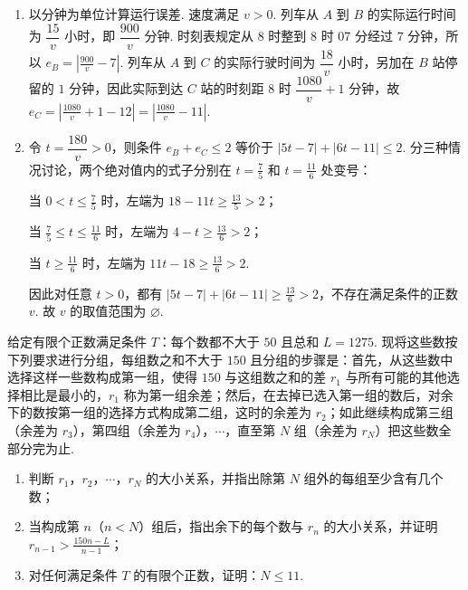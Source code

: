 \begin{solution}
\begin{enumerate}
\item 以分钟为单位计算运行误差. 速度满足 \(v>0\). 列车从 \(A\) 到 \(B\) 的实际运行时间为
\(\dfrac{15}{v}\) 小时，即 \(\dfrac{900}{v}\) 分钟. 时刻表规定从 8 时整到 8 时 07 分经过 \(7\) 分钟，所以
\(e_{B}=\left\lvert\frac{900}{v}-7\right\rvert\).
列车从 \(A\) 到 \(C\) 的实际行驶时间为 \(\dfrac{18}{v}\) 小时，另加在 \(B\) 站停留的 \(1\) 分钟，因此实际到达 \(C\) 站的时刻距 \(8\) 时
\(\dfrac{1080}{v}+1\) 分钟，故
\(e_{C}=\left\lvert\frac{1080}{v}+1-12\right\rvert=\left\lvert\frac{1080}{v}-11\right\rvert\).

\item 令 \(t=\dfrac{180}{v}>0\)，则条件 \(e_{B}+e_{C}\leqslant2\) 等价于
\(\lvert5t-7\rvert+\lvert6t-11\rvert\leqslant2\).
分三种情况讨论，两个绝对值内的式子分别在 \(t=\frac{7}{5}\) 和 \(t=\frac{11}{6}\) 处变号：

当 \(0<t\leqslant\frac{7}{5}\) 时，左端为
\(18-11t\geqslant\frac{13}{5}>2\)；

当 \(\frac{7}{5}\leqslant t\leqslant\frac{11}{6}\) 时，左端为
\(4-t\geqslant\frac{13}{6}>2\)；

当 \(t\geqslant\frac{11}{6}\) 时，左端为
\(11t-18\geqslant\frac{13}{6}>2\).

因此对任意 \(t>0\)，都有
\(\lvert5t-7\rvert+\lvert6t-11\rvert\geqslant\frac{13}{6}>2\)，不存在满足条件的正数 \(v\). 故
\(v\) 的取值范围为 \(\varnothing\).
\end{enumerate}
\end{solution}

\begin{problem}
给定有限个正数满足条件 \(T\)：每个数都不大于 \(50\) 且总和 \(L=1275\). 现将这些数按下列要求进行分组，每组数之和不大于 \(150\) 且分组的步骤是：首先，从这些数中选择这样一些数构成第一组，使得 \(150\) 与这组数之和的差 \(r_{1}\) 与所有可能的其他选择相比是最小的，\(r_{1}\) 称为第一组余差；然后，在去掉已选入第一组的数后，对余下的数按第一组的选择方式构成第二组，这时的余差为 \(r_{2}\)；如此继续构成第三组（余差为 \(r_{3}\)），第四组（余差为 \(r_{4}\)），\(\cdots\)，直至第 \(N\) 组（余差为 \(r_{N}\)）把这些数全部分完为止.

\begin{enumerate}
\item 判断 \(r_{1}\)，\(r_{2}\)，\(\cdots\)，\(r_{N}\) 的大小关系，并指出除第 \(N\) 组外的每组至少含有几个数；
\item 当构成第 \(n\)（\(n<N\)）组后，指出余下的每个数与 \(r_{n}\) 的大小关系，并证明 \(r_{n-1}>\frac{150n-L}{n-1}\)；
\item 对任何满足条件 \(T\) 的有限个正数，证明：\(N\leqslant 11\).
\end{enumerate}
\end{problem}

